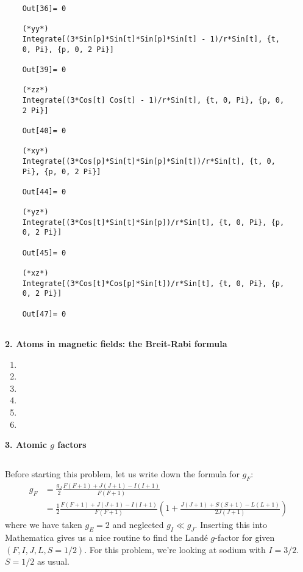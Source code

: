 \documentclass{article}
\theoremstyle{definition}
\newcommand{\f}[2]{\frac{#1}{#2}}
\newcommand{\lp}{\left(}
\newcommand{\rp}{\right)}
\begin{document}
\begin{enumerate}[label=(\alph*)]
\begin{lstlisting}
	Out[36]= 0
	
	(*yy*)
	Integrate[(3*Sin[p]*Sin[t]*Sin[p]*Sin[t] - 1)/r*Sin[t], {t, 
	0, Pi}, {p, 0, 2 Pi}]
	
	Out[39]= 0
	
	(*zz*)
	Integrate[(3*Cos[t] Cos[t] - 1)/r*Sin[t], {t, 0, Pi}, {p, 0, 
	2 Pi}]
	
	Out[40]= 0
	
	(*xy*)
	Integrate[(3*Cos[p]*Sin[t]*Sin[p]*Sin[t])/r*Sin[t], {t, 0, 
	Pi}, {p, 0, 2 Pi}]
	
	Out[44]= 0
	
	(*yz*)
	Integrate[(3*Cos[t]*Sin[t]*Sin[p])/r*Sin[t], {t, 0, Pi}, {p, 
	0, 2 Pi}]
	
	Out[45]= 0
	
	(*xz*)
	Integrate[(3*Cos[t]*Cos[p]*Sin[t])/r*Sin[t], {t, 0, Pi}, {p, 
	0, 2 Pi}]
	
	Out[47]= 0
	
	\end{lstlisting}
	
	
	
\end{enumerate}



\noindent \textbf{2. Atoms in magnetic fields: the Breit-Rabi formula}



\begin{enumerate}[label=(\alph*)]
	\item 
	
	\item 
	
	\item 
	
	\item 
	
	\item 
	
	\item 
\end{enumerate}


\noindent \textbf{3. Atomic $g$ factors}

$\,$


\noindent Before starting this problem, let us write down the formula for $g_F$:
\begin{align*}
g_F &= \f{g_J}{2}\f{F(F+1) + J(J+1)-I(I+1)}{F(F+1)} \\
&= \f{1}{2}\f{F(F+1) + J(J+1)-I(I+1)}{F(F+1)}\lp 1 + \f{J(J+1)+S(S+1)-L(L+1)}{2J(J+1)} \rp
\end{align*} 
where we have taken $g_E = 2$ and neglected $g_I \ll g_J$. Inserting this into Mathematica gives us a nice routine to find the Land\'{e} $g$-factor for given $(F,I,J,L,S=1/2)$. For this problem, we're looking at sodium with $I=3/2$. $S=1/2$ as usual. 
\end{document}

